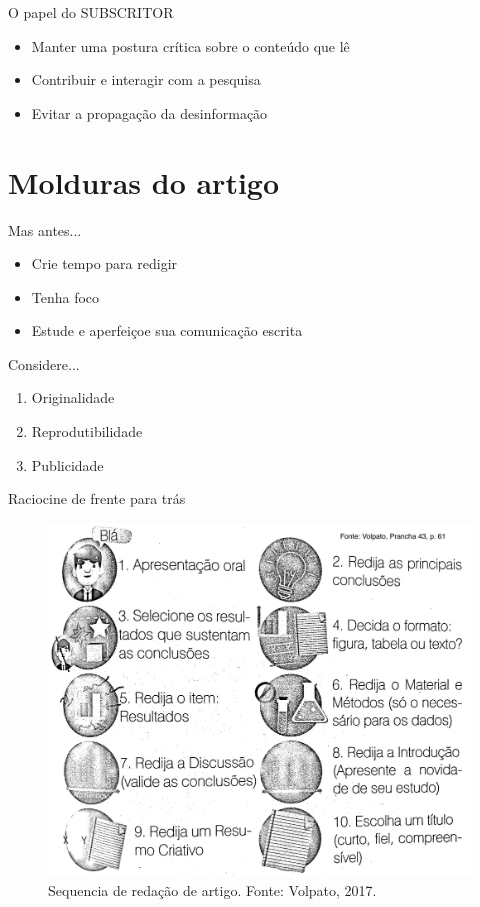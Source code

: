 \begin{frame}{O papel do SUBSCRITOR} 
\begin{itemize}
\item Manter uma postura crítica sobre o conteúdo que lê
\item Contribuir e interagir com a pesquisa
\item Evitar a propagação da desinformação
\end{itemize}
\end{frame}

\section{Molduras do artigo}

\begin{frame}{Mas antes...}
\begin{itemize}
\item Crie tempo para redigir
\item Tenha foco
\item Estude e aperfeiçoe sua comunicação escrita
\end{itemize}
\end{frame}


\begin{frame}{Considere...}
\begin{enumerate}
\item Originalidade
\item Reprodutibilidade
\item Publicidade 
\end{enumerate}
\end{frame}


\begin{frame}{Raciocine de frente para trás}
\begin{figure}
\centering
\includegraphics[scale=0.09]{figs/05/sequencia-redacao}
\caption{Sequencia de redação de artigo. Fonte: Volpato, 2017.}
\end{figure}
\end{frame}

